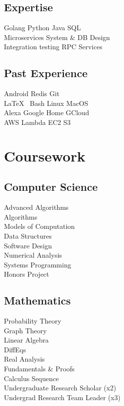 \documentclass[]{deedy-resume-openfont}
\begin{document}
\begin{minipage}[t]{0.33\textwidth}
\subsection{Expertise}
Golang \textbullet{} Python \textbullet{} Java \textbullet{} SQL \\
Microservices \textbullet{} System \& DB Design \\
Integration testing \textbullet{} RPC Services \\
\vspace{2pt}

\subsection{Past Experience}
Android  \textbullet{} Redis \textbullet{} Git \\
\LaTeX\ \textbullet{} Bash \textbullet{} Linux \textbullet{} MacOS \\
Alexa \textbullet{} Google Home \textbullet{} GCloud \\
AWS \textbullet{} Lambda \textbullet{} EC2 \textbullet{} S3 \\
\sectionsep



\vspace{8pt}

\section{Coursework}
\subsection{Computer Science}
Advanced Algorithms \\
Algorithms \\
Models of Computation \\
Data Structures \\
Software Design \\
Numerical Analysis \\
Systems Programming\\
Honors Project \\
\sectionsep

\subsection{Mathematics}
Probability Theory \\
Graph Theory \\
Linear Algebra \\
DiffEqs \\
Real Analysis \\
Fundamentals \& Proofs \\
Calculus Sequence \\
Undergraduate Research Scholar (x2) \\
Undergrad Research Team Leader (x3) \\
\sectionsep



\end{minipage}
\end{document}

